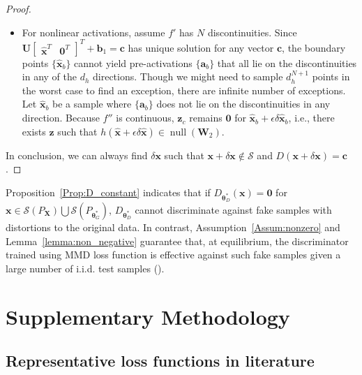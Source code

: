\documentclass{article} %
\theoremstyle{plain}
\newtheorem*{proposition 1*}{Proposition 1}
\DeclareMathOperator{\nul}{null}
\newcommand{\rvect}[1]{\begin{bmatrix} #1 \end{bmatrix}}
\newcommand{\ds}[1]{\mathcal{#1}}  %
\newcommand{\rdv}[1]{\mathbf{#1}}  %
\begin{document}
\begin{appendices}
\begin{proof}
\begin{enumerate}[(a),leftmargin=*]
\begin{itemize}[leftmargin=*]
			\item For nonlinear activations, assume \(f'\) has \(N\) discontinuities. Since \(\bm{U}\rvect{\hat{\bm{x}}^T&\bm{0}^T}^T+\bm{b}_1=\bm{c}\) has unique solution for any vector \(\bm{c}\), the boundary points \(\{\hat{\bm{x}}_b\}\) cannot yield pre-activations \(\{\bm{a}_b\}\) that all lie on the discontinuities in any of the \(d_h\) directions. Though we might need to sample \(d_h^{N+1}\) points in the worst case to find an exception, there are infinite number of exceptions. Let \(\hat{\bm{x}}_b\) be a sample where \(\{\bm{a}_b\}\) does not lie on the discontinuities in any direction. Because \(f''\) is continuous, \(\bm{z}_c\) remains \(\bm{0}\) for \(\hat{\bm{x}}_b+\epsilon\delta\hat{\bm{x}}_b\), i.e., there exists \(\bm{z}\) such that \(h(\hat{\bm{x}}+\epsilon\delta\hat{\bm{x}})\in\nul(\bm{W}_2)\).
		\end{itemize}
	\end{enumerate}
	In conclusion, we can always find \(\delta\bm{x}\) such that \(\bm{x}+\delta\bm{x}\notin\ds{S}\) and \(D(\bm{x}+\delta\bm{x})=\bm{c}\).
\end{proof}

Proposition~\ref{Prop:D_constant} indicates that if \(D_{\bm{\theta}_D^*}(\bm{x})=\bm{0}\) for \(\bm{x}\in\ds{S}(P_{\rdv{X}})\bigcup\ds{S}(P_{\bm{\theta}_G^*})\), \(D_{\bm{\theta}_D^*}\) cannot discriminate against fake samples with distortions to the original data. In contrast, Assumption~\ref{Assum:nonzero} and Lemma~\ref{lemma:non_negative} guarantee that, at equilibrium, the discriminator trained using MMD loss function is effective against such fake samples given a large number of i.i.d. test samples (\cite{mmdtest}).

\section{Supplementary Methodology}
\label{sec:supp_method}
\subsection{Representative loss functions in literature}
\label{sec:loss_literature}


\end{appendices}
\end{document}
